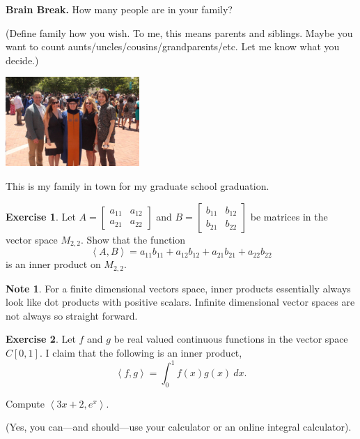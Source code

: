 \documentclass{beamer}
\newcommand{\fn}{\insertframenumber}
\newcommand{\ip}[2]{\left\langle #1,#2\right\rangle}
\theoremstyle{definition}
\newtheorem{exercise}{Exercise}
\newtheorem*{nb}{Note}
\begin{document}
\begin{frame}{\fn}
	\begin{block}{\textbf{Brain Break.}}
		How many people are in your family? 
		
		(Define family how you wish. To me, this means parents and siblings.  Maybe you want to count aunts/uncles/cousins/grandparents/etc. Let me know what you decide.)
		
		\begin{center}
			\includegraphics[width=2in]{images/emory_grad}
			
			This is my family in town for my graduate school graduation.
		\end{center}
	
		
	\end{block}
\end{frame}
\begin{frame}{\fn}
	\begin{exercise}\label{MatInnerProd}
		Let $A=\begin{bmatrix} a_{11}&a_{12}\\a_{21}&a_{22}\end{bmatrix}$ and $B=\begin{bmatrix}b_{11}&b_{12}\\b_{21}&b_{22}\end{bmatrix}$ be matrices in the vector space $M_{2,2}$.  Show that the function
			\[\ip{A}{B}=a_{11}b_{11}+a_{12}b_{12}+a_{21}b_{21}+a_{22}b_{22}\]
		is an inner product on $M_{2,2}$.
	\end{exercise}
	\begin{nb}
		For a finite dimensional vectors space, inner products essentially always look like dot products with positive scalars.  Infinite dimensional vector spaces are not always so straight forward.
	\end{nb}
\end{frame}
\begin{frame}{\fn}
	\begin{exercise}
		Let $f$ and $g$ be real valued continuous functions in the vector space $C[0,1]$.  I claim that the following is an inner product,\[\ip{f}{g}=\int_0^1 f(x)g(x)\ dx.\]
		
		Compute $\ip{3x+2}{e^x}$. 
		
		(Yes, you can---and should---use your calculator or an online integral calculator).
	\end{exercise}
\end{frame}
\end{document}
